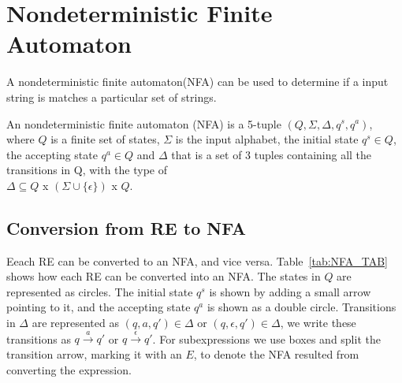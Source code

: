 \section{Nondeterministic Finite Automaton}
A nondeterministic finite automaton(NFA) can be used to determine if a input string is matches a particular set of strings.
\begin{mydef}
An nondeterministic finite automaton (NFA) is a 5-tuple $(Q,\Sigma,\Delta,q^s ,q^a)$, where $Q$ is a finite set of states, $\Sigma$ is the input alphabet, the initial state $q^s \in Q$,  the accepting state $q^a \in Q$ and $\Delta$ that is a set of 3 tuples containing all the transitions in Q, with the type of\\ $\Delta \subseteq Q $ x $ (\Sigma \cup \{\epsilon\}) $ x $ Q$. 
\end{mydef}

\subsection{Conversion from RE to NFA}
\label{RA_TO_NFA}
Eeach RE can be converted to an NFA, and vice versa. Table~\ref{tab:NFA_TAB} shows how each RE can be converted into an NFA. The states in $Q$ are represented as circles. The initial state $q^s$ is shown by adding a small arrow pointing to it, and the accepting state $q^a$ is shown as a double circle. Transitions in $\Delta$ are represented as  $(q,a,q')\in \Delta$ or $(q,\epsilon ,q')\in\Delta$, we write these transitions as $q \xrightarrow{a} q'$ or $q \xrightarrow{\epsilon} q'$. For subexpressions we use boxes and split the transition arrow, marking it with an $E$, to denote the NFA resulted from converting the expression. 

